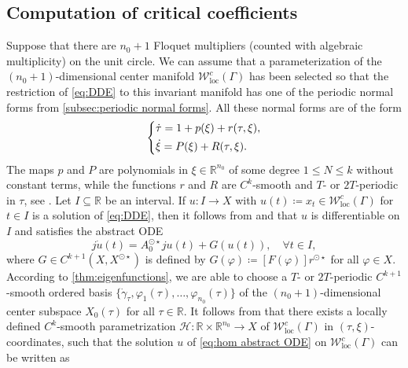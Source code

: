 \documentclass[english]{myarticle}
\DeclareMathOperator{\loc}{loc}
\begin{document}
\begin{sloppypar}
\subsection{Computation of critical coefficients} \label{subsec: periodic normal forms on the center manifold}
Suppose that there are $n_0 + 1$ Floquet multipliers (counted with algebraic multiplicity) on the unit circle. We can assume that a parameterization of the $(n_0 +1)$-dimensional center manifold $\mathcal{W}_{\loc}^c(\Gamma)$ has been selected so that the
restriction of \eqref{eq:DDE} to this invariant manifold has one of the periodic normal forms from \cref{subsec:periodic normal forms}. All these normal forms are of the form
\begin{equation} \label{eq:periodic normal form}
    \begin{dcases}
    \dot{\tau} = 1 + p(\xi) + r(\tau,\xi), \\
    \dot{\xi} = P(\xi) + R(\tau,\xi).
    \end{dcases}
\end{equation}
The maps $p$ and $P$ are polynomials in $\xi \in \mathbb{R}^{n_0}$ of some degree $ 1 \leq N \leq k$ without constant terms, while the functions $r$ and $R$ are $C^k$-smooth and $T$- or $2T$-periodic in $\tau$, see \cite[Section 2]{Witte2013}. Let $I \subseteq \mathbb{R}$ be an interval. If $u: I \to X$ with $u(t) \coloneqq x_t \in \mathcal{W}_{\loc}^{c}(\Gamma)$ for $t \in I$ is a solution of \eqref{eq:DDE}, then it follows from \cite[Theorem VII.6.1]{Diekmann1995} and \cite[Theorem 3.6]{Clement1988} that $u$ is differentiable on $I$ and satisfies the abstract ODE
\begin{equation} \label{eq:hom abstract ODE}
    j\dot{u}(t) = A_0^{\odot \star}ju(t) + G(u(t)), \quad \forall t \in I,
\end{equation}
where $G \in C^{k+1}(X,X^{\odot \star})$ is defined by $G(\varphi) \coloneqq [F(\varphi)]r^{\odot \star}$ for all $\varphi \in X$. According to \cref{thm:eigenfunctions}, we are able to choose a $T$- or $2T$-periodic $C^{k+1}$-smooth ordered basis $\{\dot{\gamma}_\tau,\varphi_1(\tau),\dots,\varphi_{n_0}(\tau) \}$ of the $(n_0+1)$-dimensional center subspace $X_0(\tau)$ for all $\tau \in \mathbb{R}$. It follows from \cite[Theorem 10, 11 and 12]{Article1} that there exists a locally defined $C^k$-smooth parametrization $\mathcal{H} : \mathbb{R} \times \mathbb{R}^{n_0} \to X$ of $\mathcal{W}_{\loc}^c(\Gamma)$ in $(\tau,\xi)$-coordinates, such that the solution $u$ of \eqref{eq:hom abstract ODE} on $\mathcal{W}_{\loc}^c(\Gamma)$ can be written as

\end{sloppypar}
\end{document}
